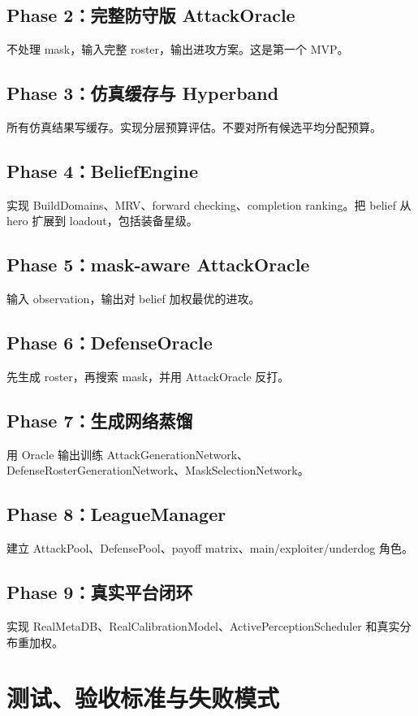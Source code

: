 \documentclass[UTF8,12pt,openany]{ctexbook}
\begin{document}
\section{Phase 2：完整防守版 AttackOracle}
不处理 mask，输入完整 roster，输出进攻方案。这是第一个 MVP。

\section{Phase 3：仿真缓存与 Hyperband}
所有仿真结果写缓存。实现分层预算评估。不要对所有候选平均分配预算。

\section{Phase 4：BeliefEngine}
实现 BuildDomains、MRV、forward checking、completion ranking。把 belief 从 hero 扩展到 loadout，包括装备星级。

\section{Phase 5：mask-aware AttackOracle}
输入 observation，输出对 belief 加权最优的进攻。

\section{Phase 6：DefenseOracle}
先生成 roster，再搜索 mask，并用 AttackOracle 反打。

\section{Phase 7：生成网络蒸馏}
用 Oracle 输出训练 AttackGenerationNetwork、DefenseRosterGenerationNetwork、MaskSelectionNetwork。

\section{Phase 8：LeagueManager}
建立 AttackPool、DefensePool、payoff matrix、main/exploiter/underdog 角色。

\section{Phase 9：真实平台闭环}
实现 RealMetaDB、RealCalibrationModel、ActivePerceptionScheduler 和真实分布重加权。


\chapter{测试、验收标准与失败模式}
\end{document}
